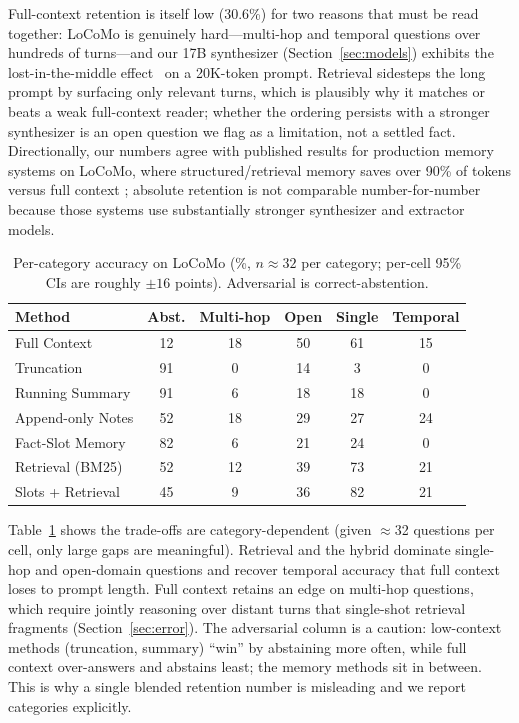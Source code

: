 \documentclass[conference]{IEEEtran}
\begin{document}
Full-context retention is itself low (30.6\%) for two reasons that must be read together: LoCoMo is genuinely hard---multi-hop and temporal questions over hundreds of turns---and our 17B synthesizer (Section~\ref{sec:models}) exhibits the lost-in-the-middle effect~\cite{nfliu2023lost} on a 20K-token prompt. Retrieval sidesteps the long prompt by surfacing only relevant turns, which is plausibly why it matches or beats a weak full-context reader; whether the ordering persists with a stronger synthesizer is an open question we flag as a limitation, not a settled fact. Directionally, our numbers agree with published results for production memory systems on LoCoMo, where structured/retrieval memory saves over 90\% of tokens versus full context \cite{chhikara2025mem0}; absolute retention is not comparable number-for-number because those systems use substantially stronger synthesizer and extractor models.

\begin{table}[h]
\centering
\caption{Per-category accuracy on LoCoMo (\%, $n\approx32$ per category; per-cell 95\% CIs are roughly $\pm 16$ points). Adversarial is correct-abstention.}
\label{tab:category}
\scriptsize
\setlength{\tabcolsep}{2.5pt}
\begin{tabular}{lccccc}
\toprule
\textbf{Method} & \textbf{Abst.} & \textbf{Multi-hop} & \textbf{Open} & \textbf{Single} & \textbf{Temporal} \\
\midrule
Full Context & 12 & 18 & 50 & 61 & 15 \\
Truncation & 91 & 0 & 14 & 3 & 0 \\
Running Summary & 91 & 6 & 18 & 18 & 0 \\
Append-only Notes & 52 & 18 & 29 & 27 & 24 \\
Fact-Slot Memory & 82 & 6 & 21 & 24 & 0 \\
Retrieval (BM25) & 52 & 12 & 39 & 73 & 21 \\
Slots + Retrieval & 45 & 9 & 36 & 82 & 21 \\
\bottomrule
\end{tabular}
\end{table}

Table~\ref{tab:category} shows the trade-offs are category-dependent (given $\approx$32 questions per cell, only large gaps are meaningful). Retrieval and the hybrid dominate single-hop and open-domain questions and recover temporal accuracy that full context loses to prompt length. Full context retains an edge on multi-hop questions, which require jointly reasoning over distant turns that single-shot retrieval fragments (Section~\ref{sec:error}). The adversarial column is a caution: low-context methods (truncation, summary) ``win'' by abstaining more often, while full context over-answers and abstains least; the memory methods sit in between. This is why a single blended retention number is misleading and we report categories explicitly.
\end{document}
